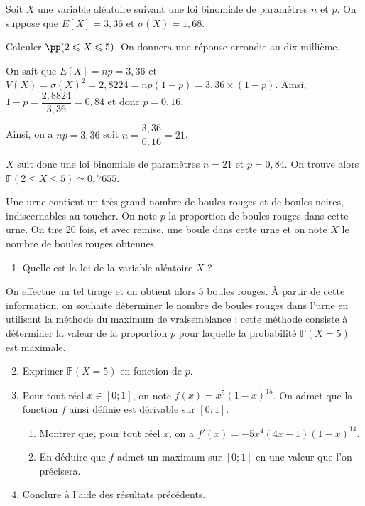 \documentclass[11pt,fleqn, openany]{book} %
\begin{document}
\begin{exercise}
Soit $X$ une variable aléatoire suivant une loi binomiale de paramètres $n$ et $p$. On suppose que $E[X]=3,36$ et $\sigma(X)=1,68$.

Calculer $\pp (2\leqslant X \leqslant 5)$. On donnera une réponse arrondie au dix-millième.
\end{exercise}

\begin{solution}
On sait que $E[X]=np=3,36$ et $V(X)=\sigma(X)^2=2,8224=np(1-p)=3,36 \times(1-p)$. Ainsi, $1-p=\dfrac{2,8824}{3,36}=0,84$ et donc $p=0,16$.

Ainsi, on a $np=3,36$ soit $n=\dfrac{3,36}{0,16}=21$.

$X$ suit donc une loi binomiale de paramètres $n=21$ et $p=0,84$. On trouve alors $\mathbb{P}(2\leqslant X \leqslant 5) \simeq 0,7655$.
\end{solution}


\begin{exercise}
Une urne contient un très grand nombre de boules rouges et de boules noires, indiscernables au toucher. On note $p$ la proportion de boules rouges dans cette urne. On tire 20 fois, et avec remise, une boule dans cette urne et on note $X$ le nombre de boules rouges obtenues.

\begin{enumerate}
\item Quelle est la loi de la variable aléatoire $X$ ?
\end{enumerate}
On effectue un tel tirage et on obtient alors 5 boules rouges. À partir de cette information, on souhaite déterminer le nombre de boules rouges dans l'urne en utilisant la méthode du maximum de vraisemblance : cette méthode consiste à déterminer la valeur de la proportion $p$ pour laquelle la probabilité $\mathbb{P}(X=5)$ est maximale.

\begin{enumerate}
\setcounter{enumi}{1}
\item Exprimer $\mathbb{P}(X=5)$ en fonction de $p$.

\item Pour tout réel $x\in[0;1]$, on note $f(x)=x^5(1-x)^{15}$. On admet que la fonction $f$ ainsi définie est dérivable sur $[0;1]$.
\begin{enumerate}
\item  Montrer que, pour tout réel $x$, on a $f'(x)=-5x^4(4x-1)(1-x)^{14}$.     
\item En déduire que $f$ admet un maximum sur $[0;1]$ en une valeur que l'on précisera.
\end{enumerate}
\item Conclure à l'aide des résultats précédents.
\end{enumerate}
\newpage
\end{exercise}
\end{document}
